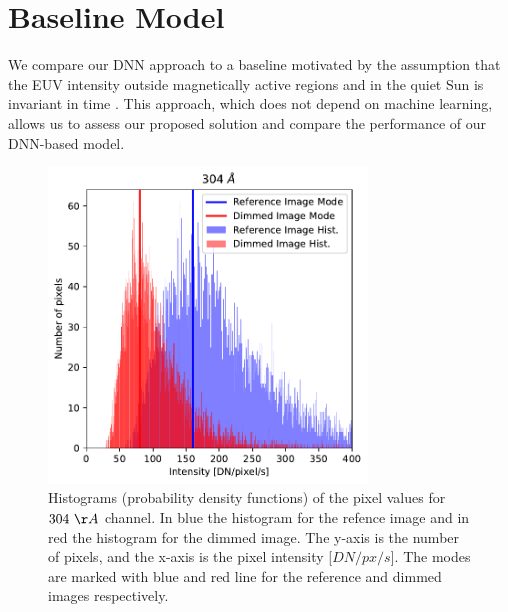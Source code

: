 \documentclass[twocolumn,usenames,dvipsnames]{aastex63}
\begin{document}
\section{Baseline Model}
\label{section:baseline}

We compare our DNN approach to a baseline motivated by the assumption that the EUV intensity outside magnetically active regions and in the quiet Sun is invariant in time 
\citep[a similar approach is also considered for the in-flight calibration of some UV instruments, e.g.][]{Schule1998}. This approach, which does not depend on  machine learning, allows us to assess our proposed solution and compare the performance of our DNN-based model. 

\begin{figure}[h]
    \centering
        \includegraphics[height=3.3in]{hist_demo.pdf}
        \caption{Histograms (probability density functions) of the pixel values for $304~\AA$  channel. In blue the histogram for the refence image and in red the histogram for the dimmed image. The y-axis is the number of pixels, and the x-axis is the pixel intensity [$DN/px/s$]. The modes are marked with blue and red line for the reference and dimmed images respectively.}
        \label{fig:baseline_histogram}
\end{figure}
\end{document}

